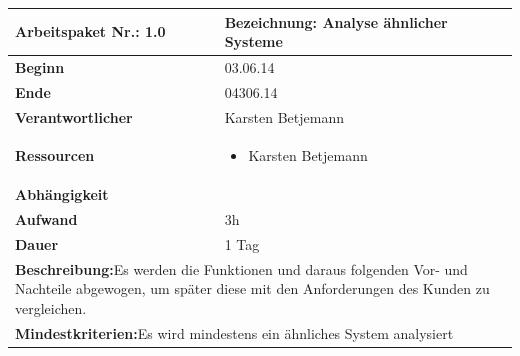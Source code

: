 \documentclass[fontsize=12pt,paper=a4,twoside]{scrartcl}
\begin{document}
	\begin{tabular}{|p{5.3cm}|p{9.7cm}|}\hline
		\textbf{Arbeitspaket Nr.:} 1.0 & \textbf{Bezeichnung:} Analyse ähnlicher Systeme\\ \hline \hline
		\textbf{Beginn} & 03.06.14\\ \hline
		\textbf{Ende} & 04306.14\\ \hline
		\textbf{Verantwortlicher} & Karsten Betjemann\\ \hline
		\textbf{Ressourcen} & \begin{itemize}
			\item Karsten Betjemann
		\end{itemize}    \\ \hline
		\textbf{Abhängigkeit} &\\ \hline
		\textbf{Aufwand} & 3h\\ \hline
		\textbf{Dauer} & 1 Tag\\ \hline
		\multicolumn{2}{|p{15cm}|}{\textbf{Beschreibung:}\newline Es werden die Funktionen und daraus folgenden Vor- und Nachteile abgewogen, um später diese mit den Anforderungen des Kunden zu vergleichen.}\\ \hline
		\multicolumn{2}{|p{15cm}|}{\textbf{Mindestkriterien:}\newline Es wird mindestens ein ähnliches System analysiert}\\ \hline   
	\end{tabular}
	
	\begin{verbatim} 
	\end{verbatim}
	
\end{document}
